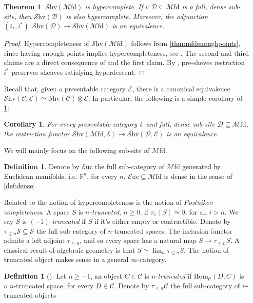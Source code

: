 \documentclass[10pt]{amsart}
\newcommand{\C}{\mathscr{C}}
\newcommand{\D}{\mathscr{D}}
\newcommand{\E}{\mathscr{E}}
\newcommand{\s}{\mathscr{S}}
\newcommand{\bR}{\mathbb{R}}
\newcommand{\Hom}{\mathrm{Hom}}
\newcommand{\Euc}{\mathscr{E}\mathrm{uc}}
\newcommand{\Mfd}{\mathscr{M}\mathrm{fd}}
\newcommand{\Shv}{\mathscr{S}\mathrm{hv}}
\newtheorem{theorem}[equation]{Theorem}
\newtheorem{corollary}[equation]{Corollary}
\theoremstyle{definition}
\newtheorem{definition}[equation]{Definition}
\theoremstyle{remark}
\numberwithin{equation}{section}
\begin{document}
\begin{theorem}\label{thm:mfdhypercomplete}
	$\Shv(\Mfd)$ is hypercomplete. If $i:\D\subseteq\Mfd$ is a full, dense sub-site, then $\Shv(\D)$ is also hypercomplete. Moreover, the adjunction $(i_*,i^*):\Shv(\D)\to\Shv(\Mfd)$ is an equivalence.
\end{theorem}
\begin{proof}
	Hypercompleteness of $\Shv(\Mfd)$ follows from \cref{thm:mfdenoughpoints}, since having enough points implies hypercompleteness, see \cite[Example 3.11.10]{barwick2020exodromy}. The second and third claims are a direct consequence of \cite[Corollary 3.12.13]{barwick2020exodromy} and the first claim. By \cite[Proposition 3.12.11]{barwick2020exodromy}, pre-sheves restriction $i^*$ preserves sheaves satisfying hyperdescent. 
\end{proof}Recall that, given a presentable category $\E$, there is a canonical equivalence $\Shv(\C,\E)\simeq\Shv(\C)\otimes\E$. In particular, the following is a simple corollary of \cref{thm:mfdhypercomplete}:
\begin{corollary}\label{cor:equivalence}
For every presentable category $\E$ and full, dense sub-site $\D\subseteq\Mfd$, the restriction functor $\Shv(\Mfd,\E)\to\Shv(\D,\E)$ is an equivalence. 	
\end{corollary}
We will mainly focus on the following sub-site of $\Mfd$.
\begin{definition}
	Denote by $\Euc$ the full sub-category of $\Mfd$ generated by Euclidean manifolds, i.e. $\bR^n$, for every $n$. $\Euc\subseteq\Mfd$ is dense in the sense of \cref{def:dense}. 
\end{definition}
Related to the notion of hypercompleteness is the notion of \emph{Postnikov completeness}. A space $S$ is \emph{$n$-truncated}, $n\geq0$, if $\pi_i(S)\simeq0$, for all $i>n$. We say $S$ is \emph{$(-1)$-truncated} if $S$ if it's either empty or contractible. Denote by $\tau_{\leq n}\s\subseteq\s$ the full sub-category of $n$-truncated spaces. The inclusion functor admits a left adjoint $\tau_{\leq n}$, and so every space has a natural map $S\to\tau_{\leq n}S$. A classical result of algebraic geometry is that $S\simeq\lim_n\tau_{\leq n}S$. The notion of truncated object makes sense in a general $\infty$-category. 
\begin{definition}[{\cite[Definition 5.5.6.1]{lurie2009htt}}]
	Let $n\geq-1$, an object $C\in\C$ is $n$\emph{-truncated} if $\Hom_\C(D,C)$ is a $n$-truncated space, for every $D\in\C$. Denote by $\tau_{\leq n}\C$ the full sub-category of $n$-truncated objects
\end{definition}

{\footnotesize


}
\end{document}
